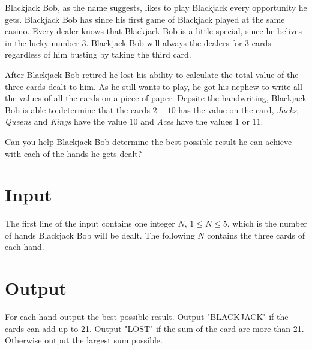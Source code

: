 Blackjack Bob, as the name suggests, likes to play Blackjack every opportunity he gets.
Blackjack Bob has since his first game of Blackjack played at the same casino. 
Every dealer knows that Blackjack Bob is a little special, since he belives in the lucky number $3$.
Blackjack Bob will always the dealers for 3 cards regardless of him busting by taking the third card.

After Blackjack Bob retired he lost his ability to calculate the total value of the three cards dealt to him.
As he still wants to play, he got his nephew to write all the values of all the cards on a piece of paper.
Depsite the handwriting, Blackjack Bob is able to determine that the cards $2-10$ has the value on the card, 
\textit{Jacks}, \textit{Queens} and \textit{Kings} have the value $10$ and \textit{Aces} have the values $1$ or $11$.

Can you help Blackjack Bob determine the best possible result he can achieve with each of the hands he gets dealt?

\section*{Input}

The first line of the input contains one integer $N$, $1 \leq N \leq 5$, which is the number of hands 
Blackjack Bob will be dealt. The following $N$ contains the three cards of each hand.


\section*{Output}

For each hand output the best possible result.
Output "BLACKJACK" if the cards can add up to 21.
Output "LOST" if the sum of the card are more than 21.
Otherwise output the largest sum possible.

